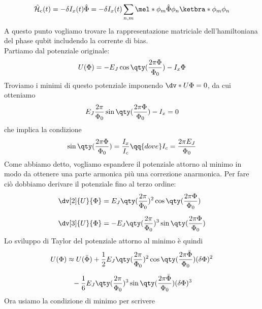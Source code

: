 \begin{equation*}
    \hat{\mathcal{H}}_{\rm c}(t)
    =-\delta I_x(t) \hat{\Phi}
    =-\delta I_x(t) \sum_{n,m} \mel*{\phi_m}{\hat{\Phi}}{\phi_n} \ketbra*{\phi_m}{\phi_n}
\end{equation*}
A questo punto vogliamo trovare la rappresentazione matriciale dell'hamiltoniana del phase qubit includendo la corrente di bias.\\
Partiamo dal potenziale originale:
\begin{equation*}
    U(\Phi)
    =- E_J \cos{ \qty( \frac{2 \pi \Phi}{\Phi_0} ) } - I_x \Phi
\end{equation*}
Troviamo i minimi di questo potenziale imponendo $\dv*{U}{\Phi}=0$, da cui otteniamo
\begin{equation*}
    E_J \frac{2 \pi}{\Phi_0} \sin{ \qty( \frac{2 \pi \Phi}{\Phi_0} ) } - I_x
    =0
\end{equation*}
che implica la condizione
\begin{equation*}
    \sin{ \qty( \frac{2 \pi \Phi}{\Phi_0} ) }
    =\frac{I_x}{I_c}
    \qq{dove}
    I_c = \frac{2 \pi E_J}{\Phi_0}
\end{equation*}
Come abbiamo detto, vogliamo espandere il potenziale attorno al minimo in modo da ottenere una parte armonica più una correzione anarmonica. Per fare ciò dobbiamo derivare il potenziale fino al terzo ordine:
\begin{equation*}
    \begin{split}
        \dv[2]{U}{\Phi}
        &=E_J \qty( \frac{2 \pi}{\Phi_0} )^2 \cos{ \qty( \frac{2 \pi \Phi}{\Phi_0} ) }\\[0.2cm]
        \dv[3]{U}{\Phi}
        &= - E_J \qty( \frac{2 \pi}{\Phi_0} )^3 \sin{ \qty( \frac{2 \pi \Phi}{\Phi_0} ) }
    \end{split}
\end{equation*}
Lo sviluppo di Taylor del potenziale attorno al minimo è quindi
\begin{equation*}
    \begin{split}
        U(\Phi)
        & \approx U(\bar{\Phi})
        + \frac{1}{2} E_J \qty( \frac{2 \pi}{\Phi_0} )^2 \cos{ \qty( \frac{2 \pi \bar{\Phi}}{\Phi_0} ) } (\delta\Phi)^2\\[0.2cm]
        & \hphantom{\approx} - \frac{1}{6} E_J \qty( \frac{2 \pi}{\Phi_0} )^3 \sin{ \qty( \frac{2 \pi \bar{\Phi}}{\Phi_0} ) } (\delta\Phi)^3
    \end{split}
\end{equation*}
Ora usiamo la condizione di minimo per scrivere
